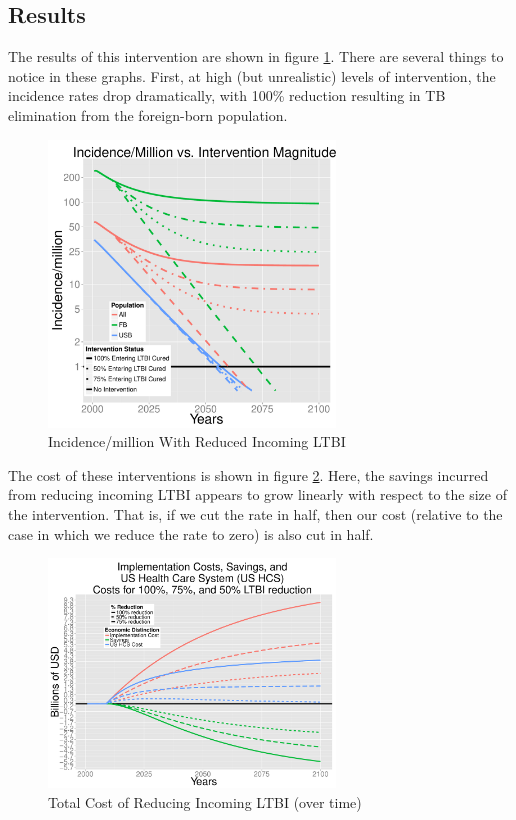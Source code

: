 \documentclass{article}[11pt]
\begin{document}
\subsection{Results}
The results of this intervention are shown in figure \ref{fig:redEnLTBIIncGrouped}. There are several things to notice in these graphs. First, at high (but unrealistic) levels of intervention, the incidence rates drop dramatically, with 100\% reduction resulting in TB elimination from the foreign-born population. %

\begin{figure}
    \centering
    \includegraphics[width=3in]{redEnLTBIIncGrouped}
    \caption{Incidence/million With Reduced Incoming LTBI}
    \label{fig:redEnLTBIIncGrouped}
\end{figure}

The cost of these interventions is shown in figure \ref{fig:redEnLTBICostGrouped}. Here, the savings incurred from reducing incoming LTBI appears to grow linearly with respect to the size of the intervention. That is, if we cut the rate in half, then our cost (relative to the case in which we reduce the rate to zero) is also cut in half.

\begin{figure}
    \centering
    \includegraphics[width=3in]{redEnLTBICostGrouped}
    \caption{Total Cost of Reducing Incoming LTBI (over time)}
    \label{fig:redEnLTBICostGrouped}
\end{figure}
\end{document}

